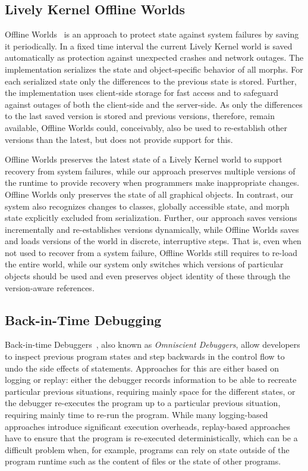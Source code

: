 \subsection{Lively Kernel Offline Worlds}

Offline Worlds~\cite{Czuchra2012OfW} is an approach to protect state against system failures by saving it periodically.
In a fixed time interval the current Lively Kernel world is saved automatically as protection against unexpected crashes and network outages.
The implementation serializes the state and object-specific behavior of all morphs.
For each serialized state only the differences to the previous state is stored.
Further, the implementation uses client-side storage for fast access and to safeguard against outages of both the client-side and the server-side.
As only the differences to the last saved version is stored and previous versions, therefore, remain available, Offline Worlds could, conceivably, also be used to re-establish other versions than the latest, but does not provide support for this.

Offline Worlds preserves the latest state of a Lively Kernel world to support recovery from system failures, while our approach preserves multiple versions of the runtime to provide recovery when programmers make inappropriate changes.
Offline Worlds only preserves the state of all graphical objects.
In contrast, our system also recognizes changes to classes, globally accessible state, and morph state explicitly excluded from serialization.
Further, our approach saves versions incrementally and re-establishes versions dynamically, while Offline Worlds saves and loads versions of the world in discrete, interruptive steps.
That is, even when not used to recover from a system failure, Offline Worlds still requires to re-load the entire world, while our system only switches which versions of particular objects should be used and even preserves object identity of these through the version-aware references.


\subsection{Back-in-Time Debugging}

Back-in-time Debuggers~\cite{Lewis2003BIT}, also known as \emph{Omniscient Debuggers}, allow developers to inspect previous program states and step backwards in the control flow to undo the side effects of statements.
Approaches for this are either based on logging or replay: either the debugger records information to be able to recreate particular previous situations, requiring mainly space for the different states, or the debugger re-executes the program up to a particular previous situation, requiring mainly time to re-run the program.
While many logging-based approaches introduce significant execution overheads, replay-based approaches have to ensure that the program is re-executed deterministically, which can be a difficult problem when, for example, programs can rely on state outside of the program runtime such as the content of files or the state of other programs.

